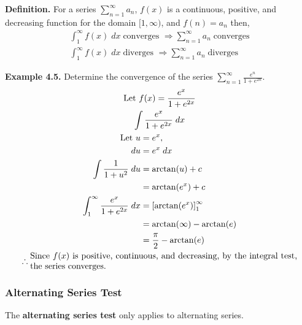 \documentclass[12pt]{article}
\begin{document}
\textbf{Definition.} For a series $\displaystyle\sum_{n=1}^{\infty}a_n$, $f(x)$ is a continuous, positive, and decreasing function for the domain $[1, \infty)$, and $f(n) = a_n$ then,
\begin{gather*}
	\displaystyle\int_{1}^{\infty}f(x)\;dx \; \text{converges } \Rightarrow \displaystyle\sum_{n=1}^{\infty}a_n \; \text{converges} \\
	\displaystyle\int_{1}^{\infty}f(x)\;dx \; \text{diverges } \Rightarrow \displaystyle\sum_{n=1}^{\infty}a_n \; \text{diverges}
\end{gather*}

\textbf{Example 4.5.} Determine the convergence of the series $\displaystyle\sum_{n=1}^{\infty}\frac{e^n}{1+e^{2n}}$.
\begin{gather*}
	\text{Let } f(x) = \frac{e^x}{1+e^{2x}}  \\
	\displaystyle\int\frac{e^x}{1+e^{2x}}\;dx \\
	\begin{aligned}
		\text{Let } u                                          & = e^{x},                               \\
		du                                                     & = e^{x} \;dx                           \\
		\displaystyle\int\frac{1}{1+u^2}\;du                   & = \arctan(u) + c                       \\
		                                                       & = \arctan(e^x) + c                     \\
		\displaystyle\int_{1}^{\infty}\frac{e^x}{1+e^{2x}}\;dx & = \left[\arctan(e^x)\right]_1^{\infty} \\
		                                                       & = \arctan(\infty) - \arctan(e)         \\
		                                                       & = \frac{\pi}{2} - \arctan(e)
	\end{aligned} \\
	\therefore \parbox{0.9\linewidth}{
		Since \( f(x) \) is positive, continuous, and decreasing, by the integral test, the series converges.}
\end{gather*}

\subsubsection{Alternating Series Test}

The \textbf{alternating series test} only applies to alternating series.
\end{document}

